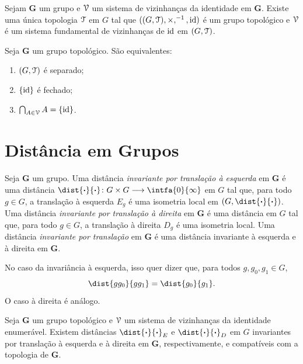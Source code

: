 \begin{prop}
Sejam $\bm G$ um grupo e $\mathcal{V}$ um sistema de vizinhanças da identidade em $\bm G$. Existe uma única topologia $\mathcal{T}$ em $G$ tal que $((G,\mathcal{T}),\times,^{-1},\mathrm{id})$ é um grupo topológico e $\mathcal{V}$ é um sistema fundamental de vizinhanças de $\mathrm{id}$ em $(G,\mathcal{T})$.
\end{prop}

\begin{prop}
Seja $\bm G$ um grupo topológico. São equivalentes:
	\begin{enumerate}
	\item $(G,\mathcal{T})$ é separado;
	\item $\{\mathrm{id}\}$ é fechado;
	\item $\bigcap_{A \in \mathcal{V}} A = \{\mathrm{id}\}$.
	\end{enumerate}
\end{prop}

\section{Distância em Grupos}

\begin{defi}
Seja $\bm G$ um grupo. Uma distância \emph{invariante por translação à esquerda} em $\bm G$ é uma distância $\dist{\var}{\var}\colon G \times G \to \intfa{0}{\infty}$ em $G$ tal que, para todo $g \in G$, a translação à esquerda $E_g$ é uma isometria local em $(G,\dist{\var}{\var})$. Uma distância \emph{invariante por translação à direita} em $\bm G$ é uma distância em $G$ tal que, para todo $g \in G$, a translação à direita $D_g$ é uma isometria local. Uma distância \emph{invariante por translação} em $\bm G$ é uma distância invariante à esquerda e à direita em $\bm G$.
\end{defi}

No caso da invariância à esquerda, isso quer dizer que, para todos $g,g_0,g_1 \in G$,
	\begin{equation*}
	\dist{gg_0}{gg_1} = \dist{g_0}{g_1}.
	\end{equation*}
O caso à direita é análogo.

\begin{prop}
Seja $\bm G$ um grupo topológico e $\mathcal{V}$ um sistema de vizinhanças da identidade enumerável. Existem distâncias $\dist{\var}{\var}_E$ e $\dist{\var}{\var}_D$ em $G$ invariantes por translação à esquerda e à direita em $\bm G$, respectivamente, e compatíveis com a topologia de $\bm G$.
\end{prop}


